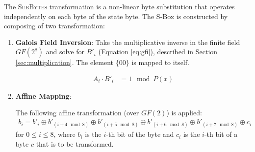 The \textsc{SubBytes} transformation is a non-linear byte substitution that operates independently on each byte of the state byte.
The S-Box is constructed by composing of two transformation:
\begin{enumerate}
    \item \textbf{Galois Field Inversion}: 
    Take the multiplicative inverse in the finite field $GF(2^8)$ and solve for ${B'}_i$ (Equation \ref{eq:gfi}), described in Section \ref{sec:multiplication}. 
    The element $\{00\}$ is mapped to itself.
    
    \begin{align}
        A_i \cdot {B'}_i &= 1 \mod P(x)
        \label{eq:gfi}
    \end{align}

    \item \textbf{Affine Mapping}:
    
    The following affine transformation (over $GF(2)$) is applied:
    \begin{align}
        b_i = {b'}_i \oplus {b'}_{(i+4 \mod 8)} \oplus {b'}_{(i+5 \mod 8)} \oplus {b'}_{(i+6 \mod 8)} \oplus {b'}_{(i+7 \mod 8)} \oplus c_i
    \end{align}
    for $0 \leq i \leq 8$, where $b_i$ is the $i$-th bit of the byte and $c_i$ is the $i$-th bit of a byte $c$ that is to be transformed.


\end{enumerate}
